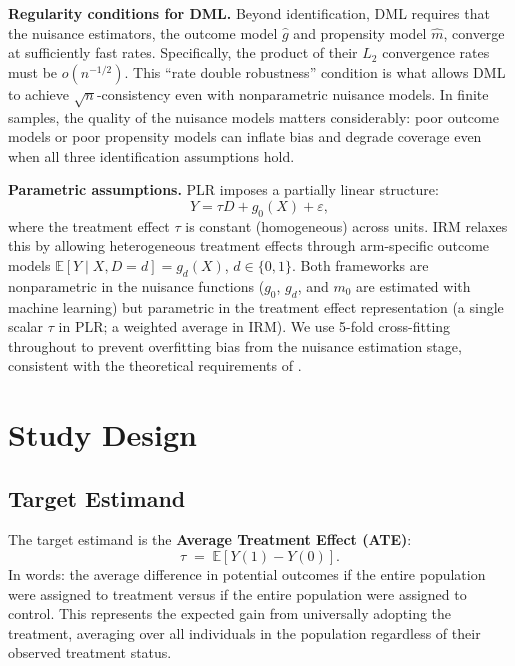 \documentclass[12pt]{article}
\begin{document}
\medskip
\noindent\textbf{Regularity conditions for DML.} Beyond identification, DML requires that the nuisance estimators, the outcome model $\hat{g}$ and propensity model $\hat{m}$, converge at sufficiently fast rates. Specifically, the product of their $L_2$ convergence rates must be $o(n^{-1/2})$. This ``rate double robustness'' condition is what allows DML to achieve $\sqrt{n}$-consistency even with nonparametric nuisance models. In finite samples, the quality of the nuisance models matters considerably: poor outcome models or poor propensity models can inflate bias and degrade coverage even when all three identification assumptions hold.

\medskip
\noindent\textbf{Parametric assumptions.} PLR imposes a partially linear structure:
\[
  Y = \tau D + g_0(X) + \varepsilon,
\]
where the treatment effect $\tau$ is constant (homogeneous) across units. IRM relaxes this by allowing heterogeneous treatment effects through arm-specific outcome models $\mathbb{E}[Y \mid X, D=d] = g_d(X)$, $d \in \{0,1\}$. Both frameworks are nonparametric in the nuisance functions ($g_0$, $g_d$, and $m_0$ are estimated with machine learning) but parametric in the treatment effect representation (a single scalar $\tau$ in PLR; a weighted average in IRM). We use 5-fold cross-fitting throughout to prevent overfitting bias from the nuisance estimation stage, consistent with the theoretical requirements of \citet{Chernozhukov2018}.

\section{Study Design}

\subsection{Target Estimand}

The target estimand is the \textbf{Average Treatment Effect (ATE)}:
\[
  \tau \;=\; \mathbb{E}\!\left[Y(1) - Y(0)\right].
\]
In words: the average difference in potential outcomes if the entire population were assigned to treatment versus if the entire population were assigned to control. This represents the expected gain from universally adopting the treatment, averaging over all individuals in the population regardless of their observed treatment status.
\end{document}
